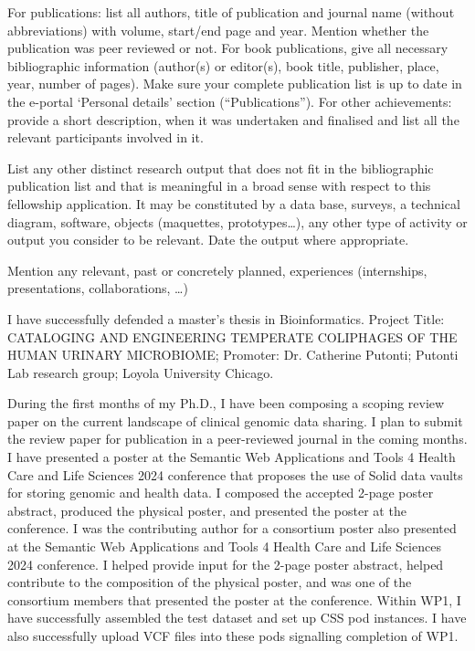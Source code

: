 {{For publications: list all authors, title of publication and journal name (without abbreviations) with volume, start/end page and year. Mention whether the publication was peer reviewed or not. For book publications, give all necessary bibliographic information (author(s) or editor(s), book title, publisher, place, year, number of pages).
Make sure your complete publication list is up to date in the e-portal ‘Personal details’ section (“Publications”).
For other achievements: provide a short description, when it was undertaken and finalised and list all the relevant participants involved in it.

List any other distinct research output that does not fit in the bibliographic publication list and that is meaningful in a broad sense with respect to this fellowship application. It may be constituted by a data base, surveys, a technical diagram, software, objects (maquettes, prototypes…), any other type of activity or output you consider to be relevant. Date the output where appropriate.

Mention any relevant, past or concretely planned, experiences (internships, presentations, collaborations, …)
}

I have successfully defended a master's thesis in Bioinformatics. Project Title: CATALOGING AND ENGINEERING TEMPERATE COLIPHAGES OF THE HUMAN
URINARY MICROBIOME; Promoter: Dr. Catherine Putonti; Putonti Lab research group; Loyola University Chicago. 

During the first months of my Ph.D., I have been composing a scoping review paper on the current landscape of clinical genomic data sharing.
I plan to submit the review paper for publication in a peer-reviewed journal in the coming months.
I have presented a poster at the Semantic Web Applications and Tools 4 Health Care and Life Sciences 2024 conference that proposes the use of Solid data vaults for storing genomic and health data.
I composed the accepted 2-page poster abstract, produced the physical poster, and presented the poster at the conference.
I was the contributing author for a consortium poster also presented at the Semantic Web Applications and Tools 4 Health Care and Life Sciences 2024 conference. I helped provide input for the 2-page poster abstract, helped contribute to the composition of the physical poster, and was one of the consortium members that presented the poster at the conference.
Within WP1, I have successfully assembled the test dataset and set up CSS pod instances.
I have also successfully upload VCF files into these pods signalling completion of WP1. 

}
